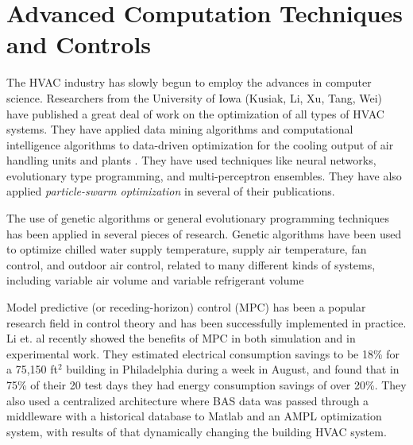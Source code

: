 \section{Advanced Computation Techniques and Controls}

The HVAC industry has slowly begun to employ the advances in computer
science. Researchers from the University of Iowa (Kusiak, Li, Xu, Tang,
Wei) have published a great deal of work on the optimization of all
types of HVAC systems. They have applied data mining algorithms and
computational intelligence algorithms to data-driven optimization for
the cooling output of air handling units and plants
\cite{Kusiak2014MinimizationOfEnergyConsumptionInHVAC, HeXiaofei2014,
Kusiak2013MinimizingEnergyConsumption,
Kusiak2012ModelingAndOptimizationOfHVAC, Kusiak2011MultiObjective,
Kusiak2010ReheatBox, WeiXiupeng2015,
WeiXiupeng2014ModelingAndOptimizationOfAChillerPlant, Kusiak2010,
Kusiak2010ModelingAndOptimization,
Kusiak2011OptimizationOfAnHVACSystemWithAStrength}. They have used
techniques like neural networks, evolutionary type programming, and
multi-perceptron ensembles. They have also applied
\textit{particle-swarm optimization} in several of their publications. 

The use of genetic algorithms or general evolutionary programming
techniques has been applied in several pieces of research. Genetic
algorithms have been used to optimize chilled water supply temperature,
supply air temperature, fan control, and outdoor air control, related to
many different kinds of systems, including variable air volume and
variable refrigerant volume
\cite{Fong2006HVACProgramming,Jin2005Prediction-basedSystems,Parameshwaran2010EnergyAlgorithm,Congradac2009HVACAlgorithms}

Model predictive (or receding-horizon) control (MPC) has been a popular
research field in control theory and has been successfully implemented
in practice. Li et. al \cite{Li2015} recently showed the
benefits of MPC in both simulation and in experimental work. They
estimated electrical consumption savings to be 18\% for a 75,150
ft\(^2\) building in Philadelphia during a week in August, and found
that in 75\% of their 20 test days they had energy consumption savings
of over 20\%. They also used a centralized architecture where BAS data
was passed through a middleware with a historical database to Matlab and
an AMPL optimization system, with results of that dynamically changing
the building HVAC system.

